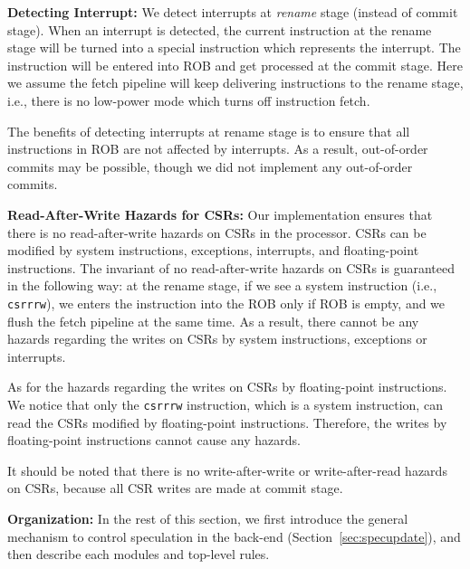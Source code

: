 \documentclass[12pt]{article}
\newcommand{\code}[1]{\texttt{#1}}
\begin{document}
\noindent\textbf{Detecting Interrupt:}
We detect interrupts at \emph{rename} stage (instead of commit stage).
When an interrupt is detected, the current instruction at the rename stage will be turned into a special instruction which represents the interrupt.
The instruction will be entered into ROB and get processed at the commit stage.
Here we assume the fetch pipeline will keep delivering instructions to the rename stage, i.e., there is no low-power mode which turns off instruction fetch.

The benefits of detecting interrupts at rename stage is to ensure that all instructions in ROB are not affected by interrupts.
As a result, out-of-order commits may be possible, though we did not implement any out-of-order commits.

\noindent\textbf{Read-After-Write Hazards for CSRs:}
Our implementation ensures that there is no read-after-write hazards on CSRs in the processor.
CSRs can be modified by system instructions, exceptions, interrupts, and floating-point instructions.
The invariant of no read-after-write hazards on CSRs is guaranteed in the following way: at the rename stage, if we see a system instruction (i.e., \code{csrrrw}), we enters the instruction into the ROB only if ROB is empty, and we flush the fetch pipeline at the same time.
As a result, there cannot be any hazards regarding the writes on CSRs by system instructions, exceptions or interrupts.

As for the hazards regarding the writes on CSRs by floating-point instructions.
We notice that only the \code{csrrrw} instruction, which is a system instruction, can read the CSRs modified by floating-point instructions.
Therefore, the writes by floating-point instructions cannot cause any hazards.

It should be noted that there is no write-after-write or write-after-read hazards on CSRs, because all CSR writes are made at commit stage.

\noindent\textbf{Organization:}
In the rest of this section, we first introduce the general mechanism to control speculation in the back-end (Section~\ref{sec:specupdate}), and then describe each modules and top-level rules.










\end{document}
